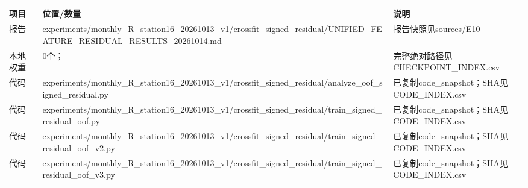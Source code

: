 \documentclass[UTF8,a4paper,landscape,10pt]{ctexart}
\begin{document}
\begin{center}\small
\begin{adjustbox}{max totalheight=0.58\textheight,max width=\linewidth}
\begin{minipage}{\linewidth}\begin{tabularx}{\linewidth}{>{\hsize=0.3500\hsize\raggedright\arraybackslash}X>{\hsize=1.9000\hsize\raggedright\arraybackslash}X>{\hsize=0.7500\hsize\raggedright\arraybackslash}X}\toprule
\textbf{项目} & \textbf{位置/\allowbreak{}数量} & \textbf{说明} \\ \midrule
报告 & experiments/\allowbreak{}monthly\_\allowbreak{}R\_\allowbreak{}station16\_\allowbreak{}20261013\_\allowbreak{}v1/\allowbreak{}crossfit\_\allowbreak{}signed\_\allowbreak{}residual/\allowbreak{}UNIFIED\_\allowbreak{}FEATURE\_\allowbreak{}RESIDUAL\_\allowbreak{}RESULTS\_\allowbreak{}20261014.md & 报告快照见sources/\allowbreak{}E10 \\
本地权重 & 0个； & 完整绝对路径见CHECKPOINT\_\allowbreak{}INDEX.csv \\
代码 & experiments/\allowbreak{}monthly\_\allowbreak{}R\_\allowbreak{}station16\_\allowbreak{}20261013\_\allowbreak{}v1/\allowbreak{}crossfit\_\allowbreak{}signed\_\allowbreak{}residual/\allowbreak{}analyze\_\allowbreak{}oof\_\allowbreak{}signed\_\allowbreak{}residual.py & 已复制code\_\allowbreak{}snapshot；SHA见CODE\_\allowbreak{}INDEX.csv \\
代码 & experiments/\allowbreak{}monthly\_\allowbreak{}R\_\allowbreak{}station16\_\allowbreak{}20261013\_\allowbreak{}v1/\allowbreak{}crossfit\_\allowbreak{}signed\_\allowbreak{}residual/\allowbreak{}train\_\allowbreak{}signed\_\allowbreak{}residual\_\allowbreak{}oof.py & 已复制code\_\allowbreak{}snapshot；SHA见CODE\_\allowbreak{}INDEX.csv \\
代码 & experiments/\allowbreak{}monthly\_\allowbreak{}R\_\allowbreak{}station16\_\allowbreak{}20261013\_\allowbreak{}v1/\allowbreak{}crossfit\_\allowbreak{}signed\_\allowbreak{}residual/\allowbreak{}train\_\allowbreak{}signed\_\allowbreak{}residual\_\allowbreak{}oof\_\allowbreak{}v2.py & 已复制code\_\allowbreak{}snapshot；SHA见CODE\_\allowbreak{}INDEX.csv \\
代码 & experiments/\allowbreak{}monthly\_\allowbreak{}R\_\allowbreak{}station16\_\allowbreak{}20261013\_\allowbreak{}v1/\allowbreak{}crossfit\_\allowbreak{}signed\_\allowbreak{}residual/\allowbreak{}train\_\allowbreak{}signed\_\allowbreak{}residual\_\allowbreak{}oof\_\allowbreak{}v3.py & 已复制code\_\allowbreak{}snapshot；SHA见CODE\_\allowbreak{}INDEX.csv \\
\bottomrule\end{tabularx}\end{minipage}\end{adjustbox}\end{center}
\end{document}
